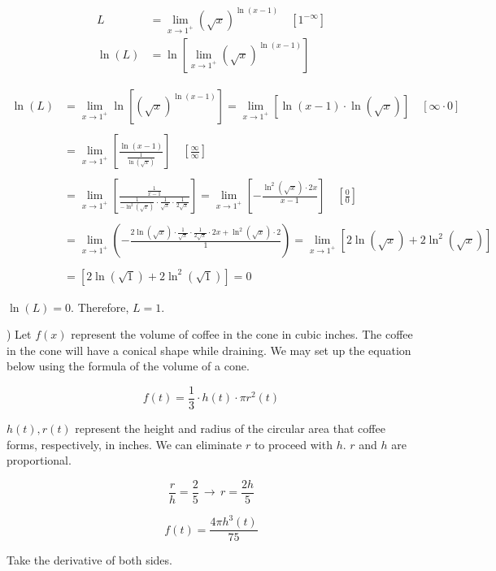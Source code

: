 \documentclass{article}
\begin{document}
\begin{align*}
L&=\lim_{x\to1^+} (\sqrt x)^{\ln(x-1)}\quad \left[1^{-\infty}\right]\\
\ln(L) &= \ln\left[\lim_{x\to1^+} (\sqrt x)^{\ln(x-1)}\right]
\end{align*}

\begin{align*}
\ln(L)&=\lim_{x\to1^+}\ln\left[(\sqrt x)^{\ln(x-1)}\right]=\lim_{x\to1^+}\left[\ln(x-1)\cdot\ln(\sqrt x)\right]\quad\left[\infty \cdot 0\right]\\\\&=\lim_{x\to1^+}\left[\frac{\ln(x-1)}{\frac1{\ln\left(\sqrt x\right)}}\right]\quad\left[\frac\infty\infty\right]\\\\&=\lim_{x\to1^+}\left[\frac{\frac1{{x-1}}}{\frac1{-\ln^2\left(\sqrt x\right)}\cdot\frac1{\sqrt x}\cdot\frac1{2\sqrt x}}\right]=\lim_{x\to1^+}\left[-\frac{\ln^2(\sqrt x)\cdot 2x}{x-1}\right]\quad\left[\frac00\right]\\\\&=\lim_{x\to1^+}\left(-\frac{2\ln\left(\sqrt x\right)\cdot \frac1{\sqrt x}\cdot\frac1{2\sqrt x}\cdot2x+\ln^2 (\sqrt x)\cdot 2 }1\right)=\lim_{x\to1^+} \left[2\ln\left(\sqrt x\right) + 2\ln^2\left(\sqrt x\right) \right]\\\\&=\left[2\ln\left(\sqrt 1\right) + 2\ln^2\left(\sqrt 1\right) \right] = 0
\end{align*}

\hfill

\noindent $\ln(L) = 0$. Therefore, $\boxed{L=1}$.

\hfill

) Let $f(x)$ represent the volume of coffee in the cone in cubic inches. The coffee in the cone will have a conical shape while draining. We may set up the equation below using the formula of the volume of a cone.

\[f(t) = \frac13\cdot h(t)\cdot \pi r^2(t)\]

\hfill

\noindent $h(t), r(t)$ represent the height and radius of the circular area that coffee forms, respectively, in inches. We can eliminate $r$ to proceed with $h$. $r$ and $h$ are proportional.

\[\frac rh=\frac25\,\rightarrow\,r=\frac{2h}5\]

\[f(t)=\frac{4\pi h^3(t)}{75}\]

\hfill

\noindent Take the derivative of both sides.
\end{document}
